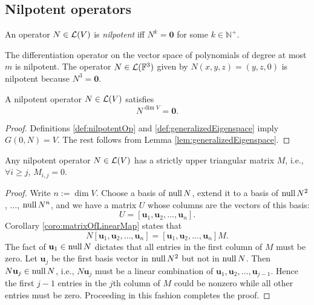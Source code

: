 \subsection{Nilpotent operators}
\label{sec:nilpotent-operators}

\begin{defn}
  \label{def:nilpotentOp}
  An operator $N\in{\cal L}(V)$
  is \emph{nilpotent} iff $N^k=\mathbf{0}$
  for some $k\in \mathbb{N}^+$.
\end{defn}

\begin{exm}
  The differentiation operator
  on the vector space of polynomials
  of degree at most $m$
  is nilpotent.
  The operator $N\in{\cal L}(\mathbb{F}^3)$
  given by $N(x,y,z)=(y,z,0)$
  is nilpotent because $N^3=\mathbf{0}$.
\end{exm}

\begin{lem}
  \label{def:nilpotentOpHighestPower}
  A nilpotent operator $N\in {\cal L}(V)$
  satisfies
  \begin{equation}
    \label{eq:nilpotentOpHighestPower}
    N^{\dim V}=\mathbf{0}.
  \end{equation}
\end{lem}
\begin{proof}
  Definitions \ref{def:nilpotentOp} and
  \ref{def:generalizedEigenspace} imply
  $G(0, N)=V$.
  The rest follows from Lemma \ref{lem:generalizedEigenspace}.
\end{proof}

\begin{lem}
  \label{lem:matrixOfNilpotentOperators}
  Any nilpotent operator $N\in {\cal L}(V)$
  has a strictly upper triangular matrix $M$, 
  i.e., $\forall i\ge j$, $M_{i,j}=0$.
\end{lem}
\begin{proof}
  Write $n:=\dim V$.
  Choose a basis of $\mathrm{null}\, N$,
  extend it to a basis of $\mathrm{null}\, N^2$,
  $\ldots$, $\mathrm{null}\, N^n$,
  and we have a matrix $U$ whose columns
  are the vectors of this basis:
  \begin{displaymath}
    U = [\mathbf{u}_1, \mathbf{u}_2, \ldots, \mathbf{u}_n].
  \end{displaymath}
  Corollary \ref{coro:matrixOfLinearMap} states that
  \begin{displaymath}
    N [\mathbf{u}_1, \mathbf{u}_2, \ldots, \mathbf{u}_n]
    = [\mathbf{u}_1, \mathbf{u}_2, \ldots, \mathbf{u}_n] M.
  \end{displaymath}
  The fact of $\mathbf{u}_1\in \mathrm{null}\,N$ dictates
  that all entries in the first column of $M$ must be zero.
  Let $\mathbf{u}_j$ be the first basis vector in $\mathrm{null}\,N^2$
  but not in $\mathrm{null}\,N$.
  Then $N \mathbf{u}_j\in \mathrm{null}\,N$, i.e., 
  $N \mathbf{u}_j$ must be a linear combination
  of $\mathbf{u}_1, \mathbf{u}_2, \ldots, \mathbf{u}_{j-1}$.
  Hence the first $j-1$ entries in the $j$th column of $M$
  could be nonzero while all other entries must be zero.
  Proceeding in this fashion completes the proof.
\end{proof}

